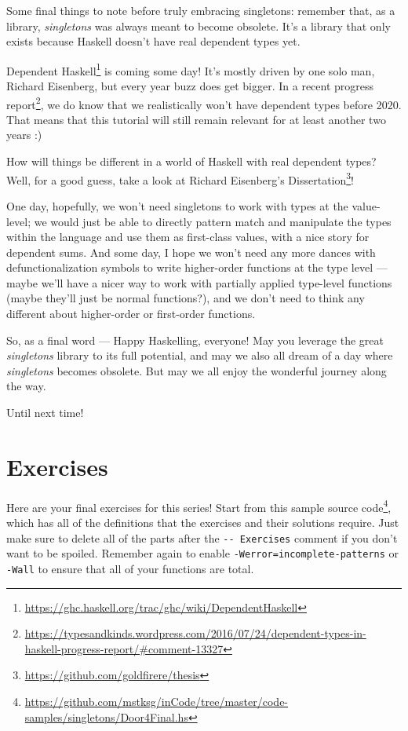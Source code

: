 \documentclass[]{article}
\renewcommand{\href}[2]{#2\footnote{\url{#1}}}
\begin{document}
Some final things to note before truly embracing singletons: remember that, as a
library, \emph{singletons} was always meant to become obsolete. It's a library
that only exists because Haskell doesn't have real dependent types yet.

\href{https://ghc.haskell.org/trac/ghc/wiki/DependentHaskell}{Dependent Haskell}
is coming some day! It's mostly driven by one solo man, Richard Eisenberg, but
every year buzz does get bigger. In a
\href{https://typesandkinds.wordpress.com/2016/07/24/dependent-types-in-haskell-progress-report/\#comment-13327}{recent
progress report}, we do know that we realistically won't have dependent types
before 2020. That means that this tutorial will still remain relevant for at
least another two years :)

How will things be different in a world of Haskell with real dependent types?
Well, for a good guess, take a look at
\href{https://github.com/goldfirere/thesis}{Richard Eisenberg's Dissertation}!

One day, hopefully, we won't need singletons to work with types at the
value-level; we would just be able to directly pattern match and manipulate the
types within the language and use them as first-class values, with a nice story
for dependent sums. And some day, I hope we won't need any more dances with
defunctionalization symbols to write higher-order functions at the type level
--- maybe we'll have a nicer way to work with partially applied type-level
functions (maybe they'll just be normal functions?), and we don't need to think
any different about higher-order or first-order functions.

So, as a final word --- Happy Haskelling, everyone! May you leverage the great
\emph{singletons} library to its full potential, and may we also all dream of a
day where \emph{singletons} becomes obsolete. But may we all enjoy the wonderful
journey along the way.

Until next time!

\hypertarget{exercises}{%
\section{Exercises}\label{exercises}}

Here are your final exercises for this series! Start from
\href{https://github.com/mstksg/inCode/tree/master/code-samples/singletons/Door4Final.hs}{this
sample source code}, which has all of the definitions that the exercises and
their solutions require. Just make sure to delete all of the parts after the
\texttt{-\/-\ Exercises} comment if you don't want to be spoiled. Remember again
to enable \texttt{-Werror=incomplete-patterns} or \texttt{-Wall} to ensure that
all of your functions are total.
\end{document}
